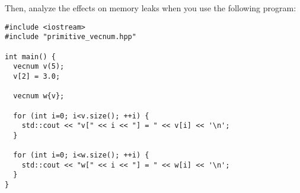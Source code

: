 Then, analyze the effects on memory leaks when you use the following  program:

\begin{lstlisting}
#include <iostream>
#include "primitive_vecnum.hpp"

int main() {
  vecnum v(5);
  v[2] = 3.0;

  vecnum w{v};

  for (int i=0; i<v.size(); ++i) {
    std::cout << "v[" << i << "] = " << v[i] << '\n';
  }

  for (int i=0; i<w.size(); ++i) {
    std::cout << "w[" << i << "] = " << w[i] << '\n';
  }
}
\end{lstlisting}

